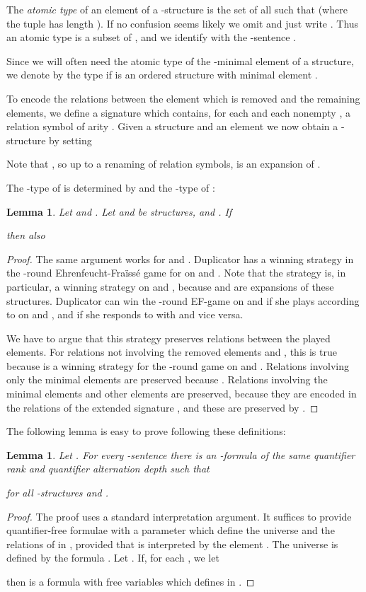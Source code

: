 \documentclass[11pt]{article}
\newtheorem{lemma}[theorem]{Lemma}
\begin{document}
The \emph{atomic type}  of an element  of a -structure
 is the set of all  such that 
(where the tuple  has length ). If no confusion seems
likely we omit  and just write . Thus an atomic type is a
subset of , and we identify  with the
-sentence
.

Since we will often need the atomic type of the -minimal element
of a structure, we denote by  the type 
if  is an ordered structure with minimal element .

To encode the relations between the element which is removed and the
remaining elements, we define a signature  which
contains, for each  and each nonempty , a relation symbol  of arity . Given a
structure  and an element  we now obtain a -structure  by setting

Note that , so up to a renaming
of relation symbols,  is an expansion of .

The -type of  is determined by  and the
-type of :
\begin{lemma}
  \label{lem:IndASrtoAS}
  Let  and . Let  and  be
  structures,  and . If
  
  then also
  
\end{lemma}
\begin{proof}
  The same argument works for  and .
  Duplicator has a winning strategy  in the -round
  Ehrenfeucht-Fra\"iss\'e game for  on  and
  . Note that the strategy  is, in particular,
  a winning strategy on  and ,
  because  and  are expansions of these
  structures. Duplicator can win the -round EF-game on  and
   if she plays according to  on 
  and , and if she responds to  with  and vice
  versa.

  We have to argue that this strategy preserves relations between the
  played elements. For relations not involving the removed elements
   and , this is true because  is a winning strategy for the
  -round game on  and . Relations
  involving only the minimal elements are preserved because
  . Relations involving the minimal
  elements and other elements are preserved, because they are encoded
  in the relations  of the extended signature ,
  and these are preserved by .
\end{proof}

The following lemma is easy to prove following these definitions:
\begin{lemma}
  \label{lem:ASrtoAS}
  Let .  For every -sentence  there is an -formula
   of the same quantifier rank and quantifier
  alternation depth such that
  
  for all -structures  and .
\end{lemma}
\begin{proof}
  The proof uses a standard interpretation argument.  It suffices to
  provide quantifier-free formulae with a parameter  which define
  the universe and the relations of  in , provided
  that  is interpreted by the element . The universe is defined
  by the formula . Let . If, for each , we let 
  
  then  is a formula with free variables
   which defines  in .
\end{proof}
\end{document}
